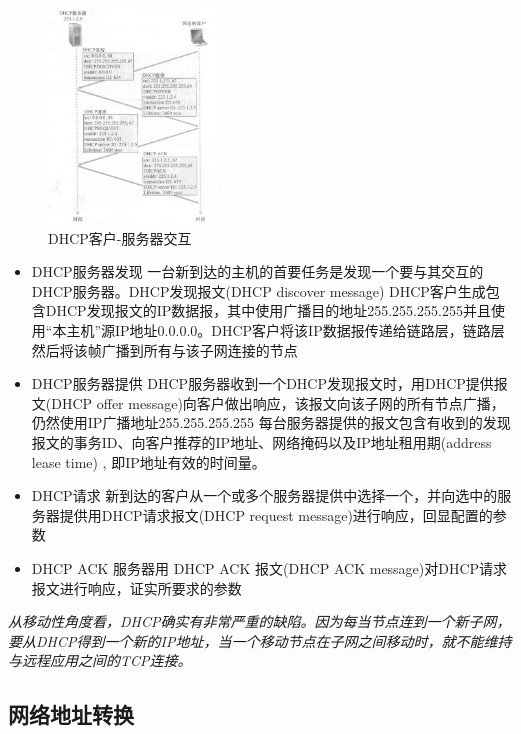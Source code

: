 \begin{figure}[!htbp]
    \centering
    \includegraphics[width=0.4\textwidth]{image/chapter04/DHCP客户-服务器交互.png}
    \caption{DHCP客户-服务器交互}
\end{figure}

\begin{itemize}
    \item DHCP服务器发现    
    \subitem 一台新到达的主机的首要任务是发现一个要与其交互的DHCP服务器。DHCP发现报文(DHCP discover message)
    \subitem DHCP客户生成包含DHCP发现报文的IP数据报，其中使用广播目的地址255.255.255.255并且使用“本主机”源IP地址0.0.0.0。DHCP客户将该IP数据报传递给链路层，链路层然后将该帧广播到所有与该子网连接的节点
    \item DHCP服务器提供
    \subitem DHCP服务器收到一个DHCP发现报文时，用DHCP提供报文(DHCP offer message)向客户做出响应，该报文向该子网的所有节点广播，仍然使用IP广播地址255.255.255.255
    \subitem 每台服务器提供的报文包含有收到的发现报文的事务ID、向客户推荐的IP地址、网络掩码以及IP地址租用期(address lease time) , 即IP地址有效的时间量。
    \item DHCP请求
    \subitem 新到达的客户从一个或多个服务器提供中选择一个，并向选中的服务器提供用DHCP请求报文(DHCP request message)进行响应，回显配置的参数
    \item DHCP ACK
    \subitem 服务器用 DHCP ACK 报文(DHCP ACK message)对DHCP请求报文进行响应，证实所要求的参数
\end{itemize}

    \emph{从移动性角度看，DHCP确实有非常严重的缺陷。因为每当节点连到一个新子网，要从DHCP得到一个新的IP地址，当一个移动节点在子网之间移动时，就不能维持与远程应用之间的TCP连接。}

\subsection{网络地址转换}


